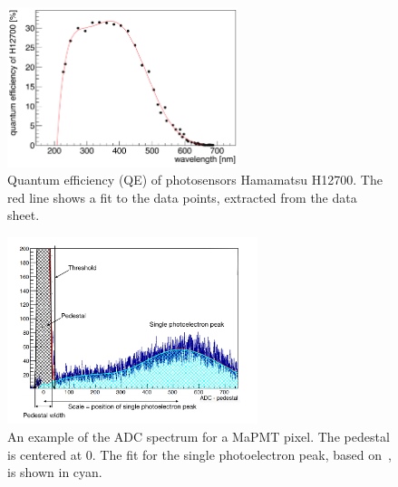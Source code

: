 \begin{figure}[!h]
\centering
\includegraphics[width=0.6\textwidth]{pics/qe.png}
\caption{\label{pic:qe}
Quantum efficiency (QE) of photosensors Hamamatsu H12700. The red line shows a fit to the data points, extracted from the data sheet.
}
\end{figure}

\begin{figure}[!h]
\centering
\includegraphics[width=0.65\textwidth]{pics/adc.pdf}
\caption{\label{pic:adc}
An example of the ADC spectrum for a MaPMT pixel. The pedestal is centered at 0. The fit for the single photoelectron peak, based on~\cite{deg}, is shown in cyan.
}
\end{figure}

